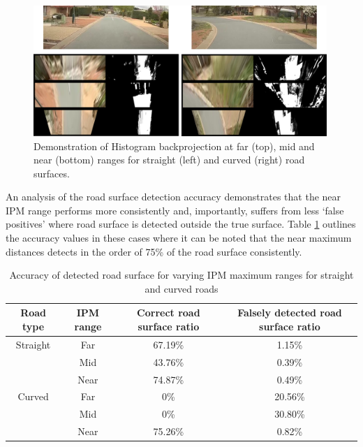 \documentclass[]{aiaa-tc}%
\begin{document}
\begin{figure}{}
	\centering
	\includegraphics[width=0.99\textwidth]{Results/ipmHistogramResults.png}
	\caption{Demonstration of Histogram backprojection at far (top), mid and near (bottom) ranges for straight (left) and curved (right) road surfaces.}
	\label{f:ipmHistogramResults}
\end{figure}

An analysis of the road surface detection accuracy demonstrates that the near IPM range performs more consistently and, importantly, suffers from less `false positives' where road surface is detected outside the true surface. Table \ref{t:ipmRangeRoadSurface} outlines the accuracy values in these cases where it can be noted that the near maximum distances detects in the order of 75\% of the road surface consistently. 


\begin{table}[]
	\centering
	\begin{tabular}{@{}cccc@{}}
		\toprule
		Road type & IPM range & Correct road surface ratio & Falsely detected road surface ratio \\ \midrule
		Straight  & Far       & 67.19\%                   & 1.15\%                             \\
		& Mid       & 43.76\%                   & 0.39\%                             \\
		& Near      & 74.87\%                   & 0.49\%                             \\
		Curved    & Far       & 0\%                        & 20.56\%                            \\
		& Mid       & 0\%                        & 30.80\%                            \\
		& Near      & 75.26\%                   & 0.82\%                             \\ \bottomrule
	\end{tabular}
	\caption{Accuracy of detected road surface for varying IPM maximum ranges for straight and curved roads}
	\label{t:ipmRangeRoadSurface}
\end{table}
\end{document}
